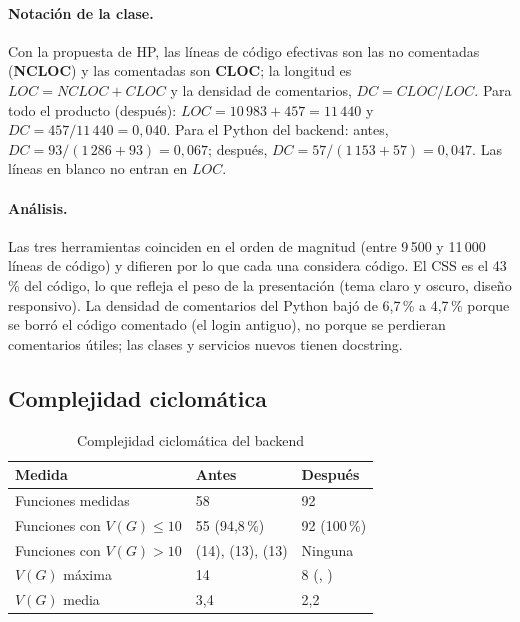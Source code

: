 \paragraph{Notación de la clase.} Con la propuesta de HP, las líneas de código efectivas son las no comentadas (\textbf{NCLOC}) y las comentadas son \textbf{CLOC}; la longitud es $LOC = NCLOC + CLOC$ y la densidad de comentarios, $DC = CLOC / LOC$. Para todo el producto (después): $LOC = 10\,983 + 457 = 11\,440$ y $DC = 457 / 11\,440 = 0{,}040$. Para el Python del backend: antes, $DC = 93 / (1\,286 + 93) = 0{,}067$; después, $DC = 57 / (1\,153 + 57) = 0{,}047$. Las líneas en blanco no entran en $LOC$.

\paragraph{Análisis.} Las tres herramientas coinciden en el orden de magnitud (entre 9\,500 y 11\,000 líneas de código) y difieren por lo que cada una considera código. El CSS es el 43\,\% del código, lo que refleja el peso de la presentación (tema claro y oscuro, diseño responsivo). La densidad de comentarios del Python bajó de 6,7\,\% a 4,7\,\% porque se borró el código comentado (el login antiguo), no porque se perdieran comentarios útiles; las clases y servicios nuevos tienen docstring.

\subsection{Complejidad ciclomática}

\begin{table}[H]
\caption{Complejidad ciclomática del backend}
\label{tab:complejidad}
\footnotesize
\begin{tabularx}{\linewidth}{L{5.2cm} Y Y}
\toprule
Medida & Antes & Después \\
\midrule
Funciones medidas & 58 & 92 \\
Funciones con $V(G) \leq 10$ \parencite{mccabe1976} & 55 (94,8\,\%) & 92 (100\,\%) \\
Funciones con $V(G) > 10$ &  (14),  (13),  (13) & Ninguna \\
$V(G)$ máxima & 14 & 8 (, ) \\
$V(G)$ media & 3,4 & 2,2 \\
\bottomrule
\end{tabularx}
\end{table}

